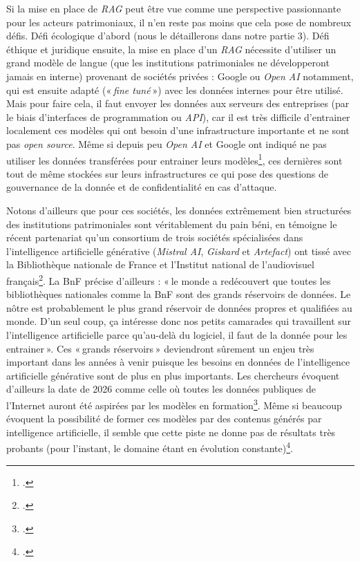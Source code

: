 Si la mise en place de \textit{RAG} peut être vue comme une perspective passionnante pour les acteurs patrimoniaux, il n’en reste pas moins que cela pose de nombreux défis. Défi écologique d’abord (nous le détaillerons dans notre partie 3). Défi éthique et juridique ensuite, la mise en place d’un \textit{RAG} nécessite d’utiliser un grand modèle de langue (que les institutions patrimoniales ne développeront jamais en interne) provenant de sociétés privées : Google ou \textit{Open AI} notamment, qui est ensuite adapté (« \textit{fine tuné} ») avec les données internes pour être utilisé. Mais pour faire cela, il faut envoyer les données aux serveurs des entreprises (par le biais d’interfaces de programmation ou \textit{API}), car il est très difficile d’entrainer localement ces modèles qui ont besoin d’une infrastructure importante et ne sont pas \textit{open source}. Même si depuis peu \textit{Open AI} et Google ont indiqué ne pas utiliser les données transférées pour entrainer leurs modèles\footcite{rochefort2023}, ces dernières sont tout de même stockées sur leurs infrastructures ce qui pose des questions de gouvernance de la donnée et de confidentialité en cas d’attaque.

Notons d’ailleurs que pour ces sociétés, les données extrêmement bien structurées des institutions patrimoniales sont véritablement du pain béni, en témoigne le récent partenariat qu’un consortium de trois sociétés spécialisées dans l’intelligence artificielle générative (\textit{Mistral AI}, \textit{Giskard} et \textit{Artefact}) ont tissé avec la Bibliothèque nationale de France et l’Institut national de l’audiovisuel français\footcite{clavey_bnf_2024}. La BnF précise d’ailleurs : « le monde a redécouvert que toutes les bibliothèques nationales comme la BnF sont des grands réservoirs de données. Le nôtre est probablement le plus grand réservoir de données propres et qualifiées au monde. D’un seul coup, ça intéresse donc nos petits camarades qui travaillent sur l’intelligence artificielle parce qu’au-delà du logiciel, il faut de la donnée pour les entrainer ». Ces « grands réservoirs » deviendront sûrement un enjeu très important dans les années à venir puisque les besoins en données de l’intelligence artificielle générative sont de plus en plus importants. Les chercheurs évoquent d’ailleurs la date de 2026 comme celle où toutes les données publiques de l’Internet auront été aspirées par les modèles en formation\footcite{forbes_internet_2024}. Même si beaucoup évoquent la possibilité de former ces modèles par des contenus générés par intelligence artificielle, il semble que cette piste ne donne pas de résultats très probants (pour l’instant, le domaine étant en évolution constante)\footcite{noauthor_entrainer_nodate}.

